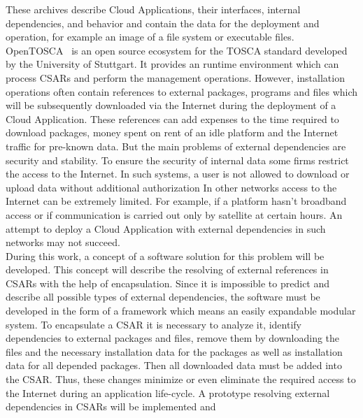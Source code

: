 These archives describe Cloud Applications, their interfaces, internal dependencies, and behavior and contain the data for the deployment and operation, for example an image of a file system or executable files.\\
OpenTOSCA~\cite*{OpenTOSCA} is an open source ecosystem for the TOSCA standard developed by the University of Stuttgart.
It provides an runtime environment which can process CSARs and perform the management operations. %
However, installation operations often contain references to external packages, programs and files which will be subsequently downloaded via the Internet during the deployment of a Cloud Application.
These references can add expenses to the time required to download packages, money spent on rent of an idle platform and the Internet traffic for pre-known data.
But the main problems of external dependencies are security and stability.
To ensure the security of internal data some firms restrict the access to the Internet.
In such systems, a user is not allowed to download or upload data without additional authorization
In other networks access to the Internet can be extremely limited.
For example, if a platform hasn't broadband access or if communication is carried out only by satellite at certain hours.
An attempt to deploy a Cloud Application with external dependencies in such networks may not succeed. \\
During this work, a concept of a software solution for this problem will be developed.
This concept will describe the resolving of external references in CSARs with the help of encapsulation.
Since it is impossible to predict and describe all possible types of external dependencies, the software must be developed in the form of a framework which means an easily expandable modular system. 
To encapsulate a CSAR it is necessary to analyze it, identify dependencies to external packages and files, remove them by downloading the files and the necessary installation data for the packages as well as installation data for all depended packages. 
Then all downloaded data must be added into the CSAR.
Thus, these changes minimize or even eliminate the required access to the Internet during an application life-cycle.
A prototype resolving external dependencies in CSARs will be implemented and 
\clearpage 
